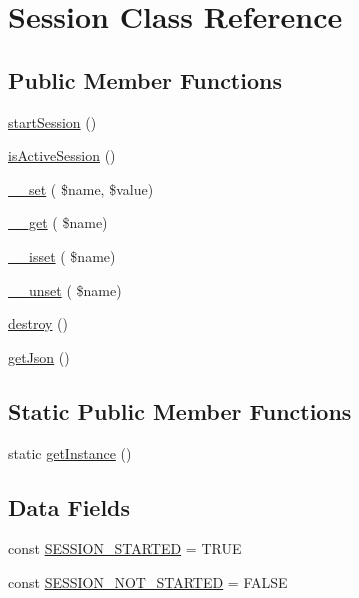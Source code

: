 \hypertarget{class_session}{}\section{Session Class Reference}
\label{class_session}
\subsection*{Public Member Functions}
\begin{DoxyCompactItemize}
\item 
\mbox{\hyperlink{class_session_a1e201c0957bc704471a78cd492174871}{start\+Session}} ()
\item 
\mbox{\hyperlink{class_session_abb17bf50828c55bc3207ac605a5c3088}{is\+Active\+Session}} ()
\item 
\mbox{\hyperlink{class_session_ab5037276ea3c15db77508b58c09ac59e}{\+\_\+\+\_\+set}} ( \$name, \$value)
\item 
\mbox{\hyperlink{class_session_acc8847f87313d5e08ad460225ca99e3b}{\+\_\+\+\_\+get}} ( \$name)
\item 
\mbox{\hyperlink{class_session_aeea656aa2c004061049f3896c564ccf0}{\+\_\+\+\_\+isset}} ( \$name)
\item 
\mbox{\hyperlink{class_session_a1a50a7a2fced40bf8afc1d437cbb8907}{\+\_\+\+\_\+unset}} ( \$name)
\item 
\mbox{\hyperlink{class_session_aa118461de946085fe42989193337044a}{destroy}} ()
\item 
\mbox{\hyperlink{class_session_a813b222d556e555333c2313e17b05bce}{get\+Json}} ()
\end{DoxyCompactItemize}
\subsection*{Static Public Member Functions}
\begin{DoxyCompactItemize}
\item 
static \mbox{\hyperlink{class_session_ac93fbec81f07e5d15f80db907e63dc10}{get\+Instance}} ()
\end{DoxyCompactItemize}
\subsection*{Data Fields}
\begin{DoxyCompactItemize}
\item 
const \mbox{\hyperlink{class_session_aeb8c4b9d65462d40a3aa64f0bcbb7921}{S\+E\+S\+S\+I\+O\+N\+\_\+\+S\+T\+A\+R\+T\+ED}} = T\+R\+UE
\item 
const \mbox{\hyperlink{class_session_a94b9c32892bf9caa605c3ed51a60e2f1}{S\+E\+S\+S\+I\+O\+N\+\_\+\+N\+O\+T\+\_\+\+S\+T\+A\+R\+T\+ED}} = F\+A\+L\+SE
\end{DoxyCompactItemize}


